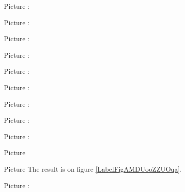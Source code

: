 Picture : 
\begin{center}
   
\end{center}
   

Picture : 
\begin{center}
   
\end{center}

Picture : 
\begin{center}
   
\end{center}


\clearpage

\huge
Picture : 
\begin{center}
   
\end{center}
\normalsize


Picture : 
\begin{center}
   
\end{center}



Picture : 
\begin{center}
   
\end{center}


Picture : 
\begin{center}
   
\end{center}


Picture : 
\begin{center}
   
\end{center}



Picture : 
\begin{center}
   
\end{center}



Picture 
\begin{center}
   
\end{center}

Picture 
The result is on figure \ref{LabelFigAMDUooZZUOqa}. %
\newcommand{\CaptionFigAMDUooZZUOqa}{<+Type your caption here+>}





Picture : 
\begin{center}
   
\end{center}

